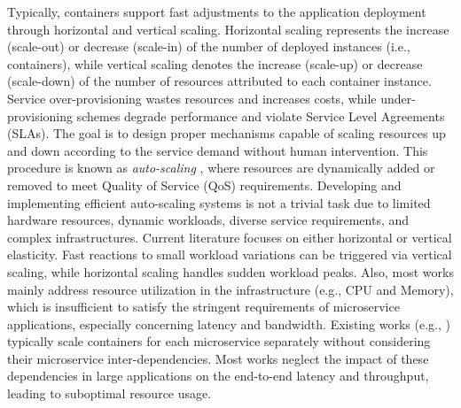 \documentclass[conference]{IEEEtran}
\begin{document}
Typically, containers support fast adjustments to the application deployment through horizontal and vertical scaling. Horizontal scaling represents the increase (scale-out) or decrease (scale-in) of the number of deployed instances (i.e., containers), while vertical scaling denotes the increase (scale-up) or decrease (scale-down) of the number of resources attributed to each container instance. Service over-provisioning wastes resources and increases costs, while under-provisioning schemes degrade performance and violate Service Level Agreements (SLAs). The goal is to design proper mechanisms capable of scaling resources up and down according to the service demand without human intervention. This procedure is known as \textit{auto-scaling} \cite{qu2018autoscaling}, where resources are dynamically added or removed to meet Quality of Service (QoS) requirements. Developing and implementing efficient auto-scaling systems is not a trivial task due to limited hardware resources, dynamic workloads, diverse service requirements, and complex infrastructures. Current literature focuses on either horizontal or vertical elasticity. Fast reactions to small workload variations can be triggered via vertical scaling, while horizontal scaling handles sudden workload peaks. Also, most works mainly address resource utilization in the infrastructure (e.g., CPU and Memory), which is insufficient to satisfy the stringent requirements of microservice applications, especially concerning latency and bandwidth. Existing works (e.g., \cite{aws2021autoscaling, kubernetesHPA, kubernetesVPA, alDhuraibi2017elasticDocker, rattihalli2019verticalScaling}) typically scale containers for each microservice separately without considering their microservice inter-dependencies. Most works neglect the impact of these dependencies in large applications on the end-to-end latency and throughput, leading to suboptimal resource usage.
\end{document}

